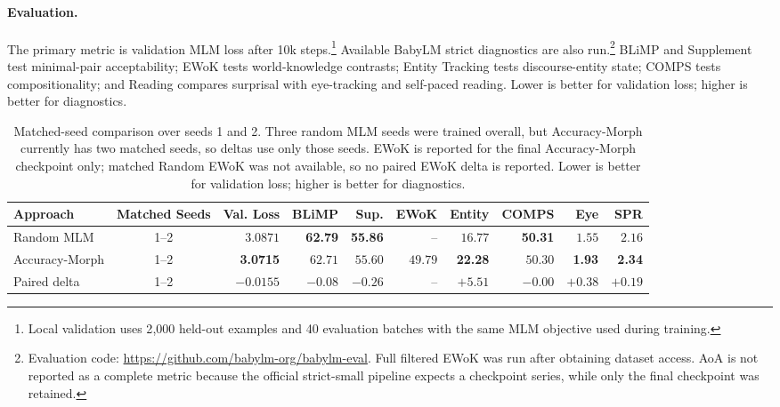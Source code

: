 \documentclass[11pt]{article}
\begin{document}
\paragraph{Evaluation.}
The primary metric is validation MLM loss after 10k steps.\footnote{Local validation uses 2{,}000 held-out examples and 40 evaluation batches with the same MLM objective used during training.}
Available BabyLM strict diagnostics are also run.\footnote{Evaluation code: \url{https://github.com/babylm-org/babylm-eval}. Full filtered EWoK was run after obtaining dataset access. AoA is not reported as a complete metric because the official strict-small pipeline expects a checkpoint series, while only the final checkpoint was retained.}
BLiMP and Supplement test minimal-pair acceptability; EWoK tests world-knowledge contrasts; Entity Tracking tests discourse-entity state; COMPS tests compositionality; and Reading compares surprisal with eye-tracking and self-paced reading.
Lower is better for validation loss; higher is better for diagnostics.

\begin{table}[t]
\centering
\fontsize{8.0}{8.7}\selectfont
\setlength{\tabcolsep}{2.4pt}
\renewcommand{\arraystretch}{1.0}
\begin{tabular}{@{}l c r r r r r r r r@{}}
\toprule
\textbf{Approach} & \textbf{Matched Seeds} & \textbf{Val. Loss} & \textbf{BLiMP} & \textbf{Sup.} & \textbf{EWoK} & \textbf{Entity} & \textbf{COMPS} & \textbf{Eye} & \textbf{SPR} \\
\midrule
\rowcolor{tablegray}
Random MLM & 1--2 & $3.0871$ & \textbf{62.79} & \textbf{55.86} & -- & $16.77$ & \textbf{50.31} & $1.55$ & $2.16$ \\
Accuracy-Morph & 1--2 & \textbf{3.0715} & $62.71$ & $55.60$ & $49.79$ & \textbf{22.28} & $50.30$ & \textbf{1.93} & \textbf{2.34} \\
\midrule
\rowcolor{tablegray}
Paired delta & 1--2 & \textbf{$-0.0155$} & $-0.08$ & $-0.26$ & -- & \textbf{$+5.51$} & $-0.00$ & \textbf{$+0.38$} & \textbf{$+0.19$} \\
\bottomrule
\end{tabular}
\caption{Matched-seed comparison over seeds 1 and 2. Three random MLM seeds were trained overall, but Accuracy-Morph currently has two matched seeds, so deltas use only those seeds. EWoK is reported for the final Accuracy-Morph checkpoint only; matched Random EWoK was not available, so no paired EWoK delta is reported. Lower is better for validation loss; higher is better for diagnostics.}
\label{tab:main-accuracy-morph}
\end{table}
\end{document}
